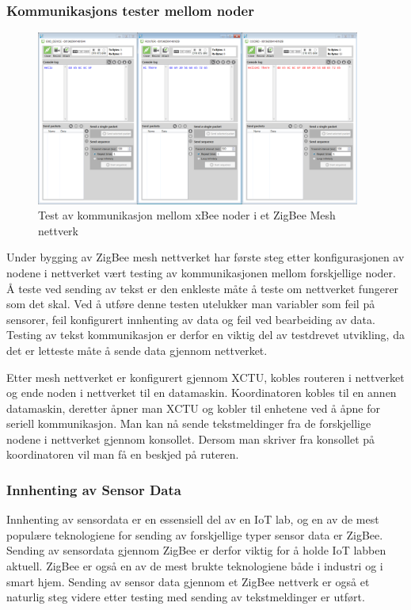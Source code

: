 \documentclass{article}
\begin{document}
\subsubsection{Kommunikasjons tester mellom noder}

\begin{figure} [!ht]
  \centering
      \includegraphics[width=0.95\textwidth]{XBeeFirstHello}
  \caption{Test av kommunikasjon mellom xBee noder i et ZigBee Mesh nettverk}
\end{figure}

Under bygging av ZigBee mesh nettverket har første steg etter konfigurasjonen av nodene i nettverket vært testing av kommunikasjonen mellom forskjellige noder. Å teste ved sending av tekst er den enkleste måte å teste om nettverket fungerer som det skal. Ved å utføre denne testen utelukker man variabler som feil på sensorer, feil konfigurert innhenting av data og feil ved bearbeiding av data. Testing av tekst kommunikasjon er derfor en viktig del av testdrevet utvikling, da det er letteste måte å sende data gjennom nettverket.

Etter mesh nettverket er konfigurert gjennom XCTU, kobles routeren i nettverket og ende noden i nettverket til en datamaskin. Koordinatoren kobles til en annen datamaskin, deretter åpner man XCTU og kobler til enhetene ved å åpne for seriell kommunikasjon. Man kan nå sende tekstmeldinger fra de forskjellige nodene i nettverket gjennom konsollet. Dersom man skriver fra konsollet på koordinatoren vil man få en beskjed på ruteren.

\subsubsection{Innhenting av Sensor Data}
Innhenting av sensordata er en essensiell del av en IoT lab, og en av de mest populære teknologiene for sending av forskjellige typer sensor data er ZigBee. Sending av sensordata gjennom ZigBee er derfor viktig for å holde IoT labben aktuell. ZigBee er også en av de mest brukte teknologiene både i industri og i smart hjem. Sending av sensor data gjennom et ZigBee nettverk er også et naturlig steg videre etter testing med sending av tekstmeldinger er utført.
\end{document}
